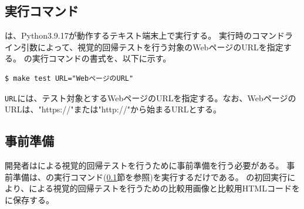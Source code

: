 \subsection{実行コマンド}\label{subsec:MixVRT_execution}
\toolName は、Python3.9.17\cite{Python}が動作するテキスト端末上で実行する。
\toolName 実行時のコマンドライン引数によって、視覚的回帰テストを行う対象のWebページのURLを指定する。
\toolName の実行コマンドの書式を、以下に示す。
\begin{lstlisting}[label=list:command,frame=none,numbers=none,basicstyle={\normalsize \ttfamily \color[gray]{.15}}]
  $ make test URL="WebページのURL"
 \end{lstlisting}
{\tt URL}には、テスト対象とするWebページのURLを指定する。なお、WebページのURLは、"https://"または"http://"から始まるURLとする。

\subsection{事前準備}\label{subsec:MixVRT_preparation}
開発者は\toolName による視覚的回帰テストを行うために事前準備を行う必要がある。
事前準備は、\toolName の実行コマンド(\ref{subsec:MixVRT_execution}節を参照)を実行するだけである。
\toolName の初回実行により、\toolName による視覚的回帰テストを行うための比較用画像と比較用HTMLコードを\toolName に保存する。
